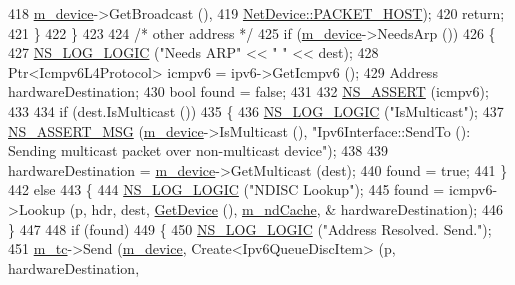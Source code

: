 \begin{DoxyCode}
418                          \hyperlink{classns3_1_1Ipv6Interface_a1330429d5db7b31fc0d5fe16609d8c61}{m\_device}->GetBroadcast (),
419                          \hyperlink{classns3_1_1NetDevice_ace65153f09144f55a0d3e702fc29d6b2a60835731aced24ac0c712ba61e62462e}{NetDevice::PACKET\_HOST});
420           \textcolor{keywordflow}{return};
421         \}
422     \}
423 
424   \textcolor{comment}{/* other address */}
425   \textcolor{keywordflow}{if} (\hyperlink{classns3_1_1Ipv6Interface_a1330429d5db7b31fc0d5fe16609d8c61}{m\_device}->NeedsArp ())
426     \{
427       \hyperlink{group__logging_ga88acd260151caf2db9c0fc84997f45ce}{NS\_LOG\_LOGIC} (\textcolor{stringliteral}{"Needs ARP"} << \textcolor{stringliteral}{" "} << dest);
428       Ptr<Icmpv6L4Protocol> icmpv6 = ipv6->GetIcmpv6 ();
429       Address hardwareDestination;
430       \textcolor{keywordtype}{bool} found = \textcolor{keyword}{false};
431 
432       \hyperlink{assert_8h_a6dccdb0de9b252f60088ce281c49d052}{NS\_ASSERT} (icmpv6);
433 
434       \textcolor{keywordflow}{if} (dest.IsMulticast ())
435         \{
436           \hyperlink{group__logging_ga88acd260151caf2db9c0fc84997f45ce}{NS\_LOG\_LOGIC} (\textcolor{stringliteral}{"IsMulticast"});
437           \hyperlink{assert_8h_aff5ece9066c74e681e74999856f08539}{NS\_ASSERT\_MSG} (\hyperlink{classns3_1_1Ipv6Interface_a1330429d5db7b31fc0d5fe16609d8c61}{m\_device}->IsMulticast (), \textcolor{stringliteral}{"Ipv6Interface::SendTo (): Sending
       multicast packet over non-multicast device"});
438 
439           hardwareDestination = \hyperlink{classns3_1_1Ipv6Interface_a1330429d5db7b31fc0d5fe16609d8c61}{m\_device}->GetMulticast (dest);
440           found = \textcolor{keyword}{true};
441         \}
442       \textcolor{keywordflow}{else}
443         \{
444           \hyperlink{group__logging_ga88acd260151caf2db9c0fc84997f45ce}{NS\_LOG\_LOGIC} (\textcolor{stringliteral}{"NDISC Lookup"});
445           found = icmpv6->Lookup (p, hdr, dest, \hyperlink{classns3_1_1Ipv6Interface_a31e06ee5ec327437ab37dddab3c85807}{GetDevice} (), \hyperlink{classns3_1_1Ipv6Interface_a1bdc18fe1112305b92a32ed8d741624b}{m\_ndCache}, &
      hardwareDestination);
446         \}
447 
448       \textcolor{keywordflow}{if} (found)
449         \{
450           \hyperlink{group__logging_ga88acd260151caf2db9c0fc84997f45ce}{NS\_LOG\_LOGIC} (\textcolor{stringliteral}{"Address Resolved.  Send."});
451           \hyperlink{classns3_1_1Ipv6Interface_ac47709de8ca8349e4275f9f074886729}{m\_tc}->Send (\hyperlink{classns3_1_1Ipv6Interface_a1330429d5db7b31fc0d5fe16609d8c61}{m\_device}, Create<Ipv6QueueDiscItem> (p, hardwareDestination, 

\end{DoxyCode}
